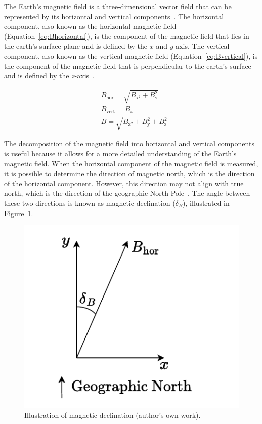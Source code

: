 \documentclass[DIV=14]{scrartcl}
\begin{document}
    The Earth's magnetic field is a three-dimensional vector field that can be represented by its horizontal and vertical components~\cite{labManual}.
    The horizontal component, also known as the horizontal magnetic field (Equation~\ref{eq:Bhorizontal}), is the component of the magnetic field
    that lies in the earth's surface plane and is defined by the $x$ and $y$-axis.
    The vertical component, also known as the vertical magnetic field (Equation~\ref{eq:Bvertical}), is the component of
    the magnetic field that is perpendicular to the earth's surface and is defined by the $z$-axis~\cite{labManual}.

    \begin{subequations}
        \begin{alignat}{1}
            & B_{\mathrm{hor}} = \sqrt{B_{\mathrm{x}^2} + B_{\mathrm{y}}^2} \label{eq:Bhorizontal}\\
            & B_{\mathrm{vert}} = B_{\mathrm{z}} \label{eq:Bvertical}\\
            & B = \sqrt{B_{\mathrm{x}^2} + B_{\mathrm{y}}^2 + B_{\mathrm{z}}^2}  \label{eq:Btotal}
        \end{alignat}
    \end{subequations}

    The decomposition of the magnetic field into horizontal and vertical components is useful because it
    allows for a more detailed understanding of the Earth's magnetic field.
    When the horizontal component of the magnetic field is measured, it is possible to determine the direction of
    magnetic north, which is the direction of the horizontal component.
    However, this direction may not align with true north, which is the direction of the geographic North Pole~\cite{CartographersOffice}.
    The angle between these two directions is known as magnetic declination ($\delta_B$), illustrated in Figure~\ref{fig:magneticDeclination}.

    \begin{figure}[!h]
        \centering
        \includegraphics[width=.4\textwidth]{figures/MagneticDeclination}
        \caption{Illustration of magnetic declination (author's own work).}
        \label{fig:magneticDeclination}
    \end{figure}
\end{document}
